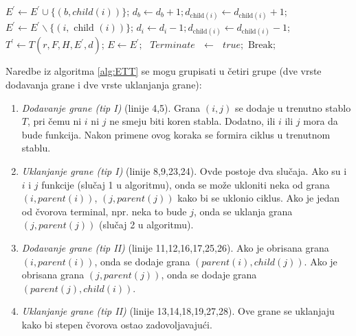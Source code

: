 \documentclass[main.tex]{subfiles}
\begin{document}
\begin{algorithm}
\begin{algorithmic}[1]
                \STATE $E^{\prime} \leftarrow E^{\prime} \cup\{(b, c h i l d(i))\}$;
                \STATE $d_{b} \leftarrow d_{b}+1 ; d_{\text {child}(i)} \leftarrow d_{\text {child}(i)}+1$;
                \STATE $E^{\prime} \leftarrow E^{\prime} \backslash\{(i, \text { child }(i))\}$;
                \STATE $d_{i} \leftarrow d_{i}-1 ; d_{\text {child}(i)} \leftarrow d_{\text {child}(i)}-1$;
             \ENDIF
             \STATE $T^{\prime} \leftarrow T\left(r, F, H, E^{\prime}, d\right)$;
                \STATE $E \leftarrow E^{\prime} ; \text { $Terminate$ } \leftarrow \text { $true$}; \text { Break; }$
             \ENDIF
        \ENDFOR
            \STATE {}
        \ENDIF
    \ENDFOR
  \end{algorithmic}
\end{algorithm}

Naredbe iz algoritma \autoref{alg:ETT} se mogu grupisati u četiri grupe (dve vrste dodavanja grane i dve vrste uklanjanja grane):

\begin{enumerate}
    \item \textit{Dodavanje grane (tip I)} (linije 4,5). Grana $(i,j)$ se dodaje u trenutno stablo $T$, pri čemu ni $i$ ni $j$ ne smeju biti koren stabla. Dodatno, ili $i$ ili $j$ mora da bude funkcija. Nakon primene ovog koraka se formira ciklus u trenutnom stablu.
    \item \textit{Uklanjanje grane (tip I)} (linije 8,9,23,24). Ovde postoje dva slučaja. Ako su i $i$ i $j$ funkcije (slučaj 1 u algoritmu), onda se može ukloniti neka od grana $(i, parent(i))$, $(j, parent(j))$ kako bi se uklonio ciklus. Ako je jedan od čvorova terminal, npr. neka to bude $j$, onda se uklanja grana $(j, parent(j))$ (slučaj 2 u algoritmu).
    \item \textit{Dodavanje grane (tip II)} (linije 11,12,16,17,25,26). Ako je obrisana grana $(i, parent(i))$, onda se dodaje grana $(parent(i), child(j))$. Ako je obrisana grana $(j, parent(j))$, onda se dodaje grana $(parent(j), child(i))$. 
    \item \textit{Uklanjanje grane (tip II)} (linije 13,14,18,19,27,28). Ove grane se uklanjaju kako bi stepen čvorova ostao zadovoljavajući.
\end{enumerate}
\end{document}

